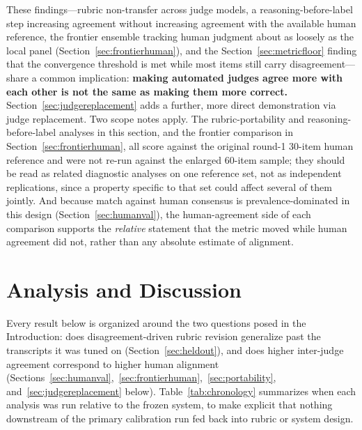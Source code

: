 \documentclass[11pt]{article}
\begin{document}
These findings---rubric non-transfer across judge models, a
reasoning-before-label step increasing agreement without increasing
agreement with the available human reference, the frontier ensemble tracking human judgment about as
loosely as the local panel (Section~\ref{sec:frontierhuman}), and the
Section~\ref{sec:metricfloor} finding that the convergence threshold is
met while most items still carry disagreement---share a common
implication: \textbf{making automated judges agree more with each other is
not the same as making them more correct.}
Section~\ref{sec:judgereplacement} adds a further, more direct
demonstration via judge replacement. Two scope notes apply. The
rubric-portability and reasoning-before-label analyses in this section,
and the frontier comparison in Section~\ref{sec:frontierhuman}, all score
against the original round-1 30-item human reference and were not re-run
against the enlarged 60-item sample; they should be read as related
diagnostic analyses on one reference set, not as independent
replications, since a property specific to that set could affect several
of them jointly. And because match against human consensus is
prevalence-dominated in this design (Section~\ref{sec:humanval}), the
human-agreement side of each comparison supports the \emph{relative}
statement that the metric moved while human agreement did not, rather
than any absolute estimate of alignment.

\section{Analysis and Discussion}
\label{sec:discussion}

Every result below is organized around the two questions posed in the
Introduction: does disagreement-driven rubric revision generalize past the
transcripts it was tuned on (Section~\ref{sec:heldout}), and does higher
inter-judge agreement correspond to higher human alignment
(Sections~\ref{sec:humanval},~\ref{sec:frontierhuman},~\ref{sec:portability},
and~\ref{sec:judgereplacement} below). Table~\ref{tab:chronology}
summarizes when each analysis was run relative to the frozen system, to
make explicit that nothing downstream of the primary calibration run fed
back into rubric or system design.
\end{document}

